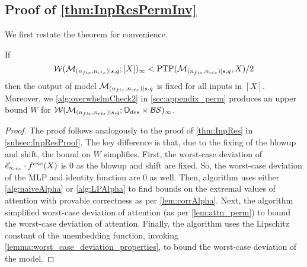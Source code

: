 \subsection{Proof of \cref{thm:InpResPermInv}}
\label{subsec:proofInpResPermInv}
We first restate the theorem for convenience.
\begin{theorem}
	If
	\[
		\mathcal{W}(\mathcal{M}_{(n_{fix}, {n_{ctx}}) \mid {s}, q}; [X])_\infty < \mathrm{PTP}(\mathcal{M}_{(n_{fix}, {n_{ctx}}) \mid {s}, q}, X) / 2
	\]
	then the output of model $\mathcal{M}_{(n_{fix}, {n_{ctx}}) \mid {s}, q}$ is fixed for all inputs in $[X]$.
	Moreover, we \cref{alg:overwhelmCheck2} in \cref{sec:appendix_perm} produces an upper bound $W$ for $\mathcal{W}(\mathcal{M}_{(n_{fix}, {n_{ctx}}) \mid {s}, q}; \mathbb{O}_{des} \times \mathcal{B} \mathcal{S})_\infty$.
\end{theorem}
\begin{proof}
	The proof follows analogously to the proof of \cref{thm:InpRes} in \cref{subsec:InpResProof}.
	The key difference is that, due to the fixing of the blowup and shift, the bound on $W$ simplifies.
	First, the worst-case deviation of $\vec{e}_{{n_{ctx}}} \cdot f^{enc}(X)$ is $0$ as the blowup and shift are fixed.
	So, the worst-case deviation of the MLP and identity function are $0$ as well.
	Then, algorithm uses either \cref{alg:naiveAlpha} or \cref{alg:LPAlpha} to find bounds on the extremal values of attention with provable correctness as per \cref{lem:corrAlpha}.
	Next, the algorithm simplified worst-case deviation of attention (as per \cref{lem:attn_perm}) to bound the worst-case deviation of attention.
	Finally, the algorithm uses the Lipschitz constant of the unembedding function, invoking \cref{lemma:worst_case_deviation_properties}, to bound the worst-case deviation of the model.
\end{proof}
